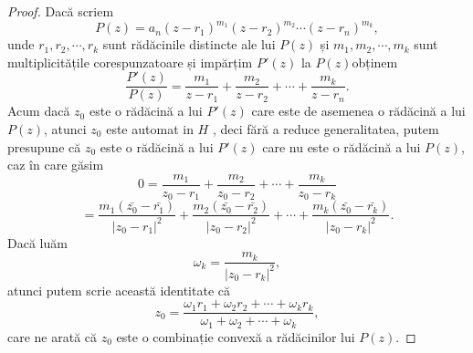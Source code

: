 \documentclass[a4paper,12pt,oneside]{report}
\begin{document}
\begin{proof}
Dacă scriem
\begin{displaymath}
  P\left ( z \right ) = a_{n}\left ( z - r_{1} \right )^{m_{1}}\left ( z - r_{2} \right )^{m_{2}}\cdots \left ( z - r_{n} \right )^{m_{k}},
\end{displaymath}
unde  \(r_{1} , r_{2}, \cdots, r_{k}\) sunt rădăcinile distincte ale lui \(P\left ( z \right )\) și \(m_{1} , m_{2}, \cdots, m_{k}\) sunt multiplicitățile corespunzatoare și impărțim \({P}'\left ( z \right )\) la \( P\left ( z \right )\)obținem
\begin{displaymath}
  \frac{{P}'\left ( z \right ) }{P\left ( z \right )} = \frac{m_{1}}{z - r_{1}} + \frac{m_{2}}{z - r_{2}}+ \cdots + \frac{m_{k}}{z - r_{n}} .
\end{displaymath}
Acum dacă \(z_{0}\) este o rădăcină a lui \({P}'\left ( z \right )\) care este de asemenea o rădăcină a lui \(P\left ( z \right )\), atunci \(z_{0}\) este automat in \(H\) , deci fără a reduce generalitatea, putem presupune că \(z_{0}\)  este o rădăcină a lui  \({P}'\left ( z \right )\) care nu este o rădăcină a lui \(P\left ( z \right )\), caz în care găsim
\begin{displaymath}
  0 = \frac{m_{1}}{z_{0} - r_{1}} + \frac{m_{2}}{z_{0} - r_{2}} +\cdots+ \frac{m_{k}}{z_{0} - r_{k}}
\end{displaymath}
\begin{displaymath}
= \frac{m_{1}\left (\bar{z_{0}} - \bar{r_{1}}\right )}{\left | z_{0}  - r_{1}\right |^{2}} + \frac{m_{2}\left (\bar{z_{0}} - \bar{r_{2}}\right )}{\left | z_{0}  - r_{2}\right |^{2}} + \cdots+ \frac{m_{k}\left (\bar{z_{0}} - \bar{r_{k}}\right )}{\left | z_{0}  - r_{k}\right |^{2}}.
\end{displaymath}
Dacă luăm
\begin{displaymath}
  \omega _{k} =\frac{ m_{k}}{\left | z_{0}  - r_{k}\right |^{2}},
\end{displaymath} atunci putem scrie această identitate că
\begin{displaymath}
  z_{0} = \frac{\omega _{1}r_{1} +\omega _{2}r{_2}+\cdots+ \omega _{k}r{_k} }{\omega _{1} + \omega _{2} + \cdots + \omega _{k}},
\end{displaymath}
care ne arată că \(z_{0}\) este o combinație convexă a rădăcinilor lui \(P\left ( z \right )\).
\end{proof}
\end{document}
